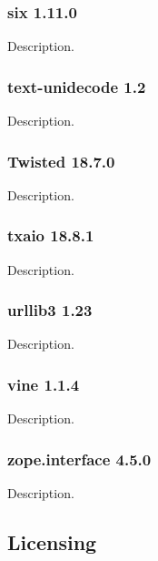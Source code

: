 \subsubsection{six 1.11.0}

Description.

\subsubsection{text-unidecode 1.2}

Description.

\subsubsection{Twisted 18.7.0}

Description.

\subsubsection{txaio 18.8.1}

Description.

\subsubsection{urllib3 1.23}

Description.

\subsubsection{vine 1.1.4}

Description.

\subsubsection{zope.interface 4.5.0}

Description.

\subsection{Licensing}

